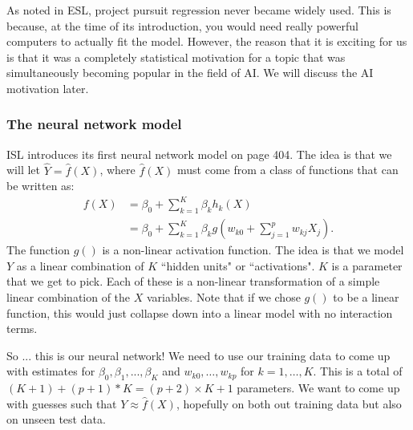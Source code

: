 As noted in ESL, project pursuit regression never became widely used. This is because, at the time of its introduction, you would need really powerful computers to actually fit the model. However, the reason that it is exciting for us is that it was a completely statistical motivation for a topic that was simultaneously becoming popular in the field of AI. We will discuss the AI motivation later. 



\subsubsection{The neural network model}

ISL introduces its first neural network model on page 404. The idea is that we will let $\hat{Y} = \hat{f}(X)$, where $\hat{f}(X)$ must come from a class of functions that can be written as: 
\begin{align}
\nonumber
{f}(X) &= {\beta}_0 + \sum_{k=1}^K {\beta}_k h_k(X)  \\
\label{eq_NN}
&=  {\beta}_0 + \sum_{k=1}^K {\beta}_k g\left(w_{k0} + \sum_{j=1}^p w_{kj} X_j \right). 
\end{align}
The function $g()$ is a non-linear activation function. The idea is that we model $Y$ as a linear combination of $K$ ``hidden units" or ``activations". $K$ is a parameter that we get to pick. Each of these is a non-linear transformation of a simple linear combination of the $X$ variables. Note that if we chose $g()$ to be a linear function, this would just collapse down into a linear model with no interaction terms. 

So ... this is our neural network! We need to use our training data to come up with estimates for $\beta_0, \beta_1, ..., \beta_K$ and $w_{k0}, \ldots, w_{kp}$ for $k=1,\ldots, K$. This is a total of $(K+1)+(p+1)*K = (p+2)\times K+1$ parameters. We want to come up with guesses such that $Y \approx \hat{f}(X)$, hopefully on both out training data but also on unseen test data. 

